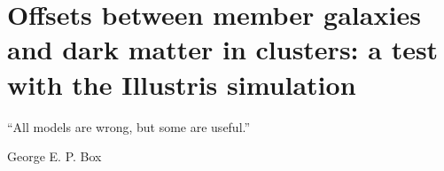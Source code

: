 
\setcounter{chapter}{2}
\chapter{Offsets between member galaxies and dark matter in
clusters: a test with the Illustris simulation}{}{}
\label{chapter3}
\epigraph{``All models are wrong, but some are useful.''}{George E. P. Box} 
